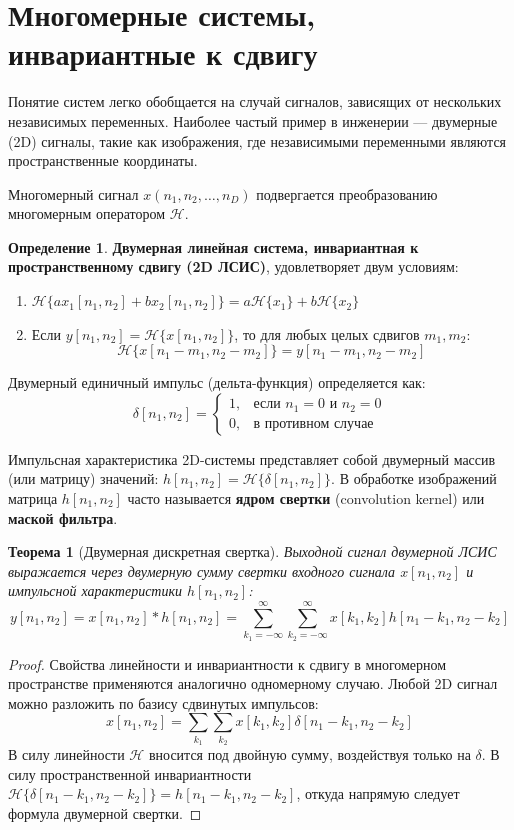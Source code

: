 \documentclass[a4paper, 12pt]{article}
\theoremstyle{definition}
\newtheorem{definition}{Определение}
\theoremstyle{plain}
\newtheorem{theorem}{Теорема}
\begin{document}
\section{Многомерные системы, инвариантные к сдвигу}

Понятие систем легко обобщается на случай сигналов, зависящих от нескольких независимых переменных. Наиболее частый пример в инженерии — двумерные (2D) сигналы, такие как изображения, где независимыми переменными являются пространственные координаты.

Многомерный сигнал $x(n_1, n_2, \dots, n_D)$ подвергается преобразованию многомерным оператором $\mathcal{H}$.

\begin{definition}
\textbf{Двумерная линейная система, инвариантная к пространственному сдвигу (2D ЛСИС)}, удовлетворяет двум условиям:
\begin{enumerate}
    \item $\mathcal{H}\{a x_1[n_1, n_2] + b x_2[n_1, n_2]\} = a\mathcal{H}\{x_1\} + b\mathcal{H}\{x_2\}$
    \item Если $y[n_1, n_2] = \mathcal{H}\{x[n_1, n_2]\}$, то для любых целых сдвигов $m_1, m_2$:
    $$ \mathcal{H}\{x[n_1 - m_1, n_2 - m_2]\} = y[n_1 - m_1, n_2 - m_2] $$
\end{enumerate}
\end{definition}

Двумерный единичный импульс (дельта-функция) определяется как:
$$
\delta[n_1, n_2] =
\begin{cases}
1, & \text{если } n_1 = 0 \text{ и } n_2 = 0 \\
0, & \text{в противном случае}
\end{cases}
$$

Импульсная характеристика 2D-системы представляет собой двумерный массив (или матрицу) значений: $h[n_1, n_2] = \mathcal{H}\{\delta[n_1, n_2]\}$. В обработке изображений матрица $h[n_1, n_2]$ часто называется \textbf{ядром свертки} (convolution kernel) или \textbf{маской фильтра}.

\begin{theorem}[Двумерная дискретная свертка]
Выходной сигнал двумерной ЛСИС выражается через двумерную сумму свертки входного сигнала $x[n_1, n_2]$ и импульсной характеристики $h[n_1, n_2]$:
$$ y[n_1, n_2] = x[n_1, n_2] * h[n_1, n_2] = \sum_{k_1=-\infty}^{\infty} \sum_{k_2=-\infty}^{\infty} x[k_1, k_2] h[n_1 - k_1, n_2 - k_2] $$
\end{theorem}
\begin{proof}
Свойства линейности и инвариантности к сдвигу в многомерном пространстве применяются аналогично одномерному случаю. Любой 2D сигнал можно разложить по базису сдвинутых импульсов:
$$ x[n_1, n_2] = \sum_{k_1} \sum_{k_2} x[k_1, k_2] \delta[n_1 - k_1, n_2 - k_2] $$
В силу линейности $\mathcal{H}$ вносится под двойную сумму, воздействуя только на $\delta$. В силу пространственной инвариантности $\mathcal{H}\{\delta[n_1 - k_1, n_2 - k_2]\} = h[n_1 - k_1, n_2 - k_2]$, откуда напрямую следует формула двумерной свертки.
\end{proof}
\end{document}
